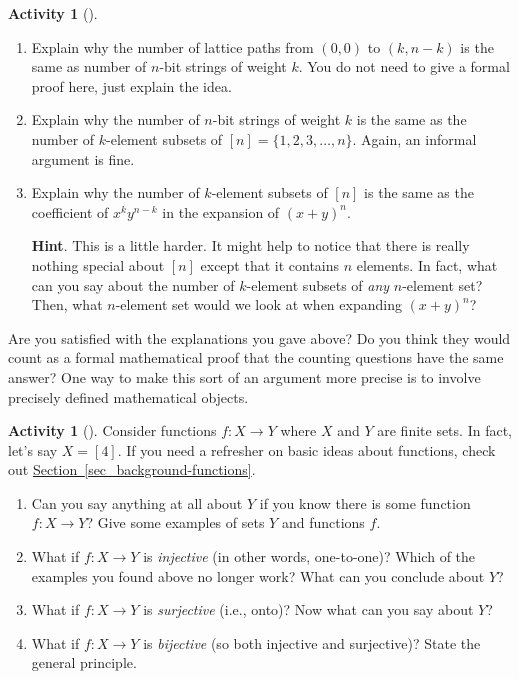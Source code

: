 \documentclass[10pt,]{book}
\theoremstyle{plain}
\theoremstyle{definition}
\theoremstyle{definition}
\theoremstyle{definition}
\newtheorem{activity}[project]{Activity}
\theoremstyle{definition}
\numberwithin{equation}{chapter}
\begin{document}
\begin{activity}[]\label{activity-11}
\leavevmode%
\begin{enumerate}[font=\bfseries,label=(\alph*),ref=\alph*]
\item\label{task-19} \hypertarget{p-413}{}%
Explain why the number of lattice paths from \((0,0)\) to \((k,n-k)\) is the same as number of \(n\)-bit strings of weight \(k\). You do not need to give a formal proof here, just explain the idea.%
\item\label{task-20} \hypertarget{p-414}{}%
Explain why the number of \(n\)-bit strings of weight \(k\) is the same as the number of \(k\)-element subsets of \([n] = \{1,2,3,\ldots, n\}\).   Again, an informal argument is fine.%
\item\label{task-21} \hypertarget{p-415}{}%
Explain why the number of \(k\)-element subsets of \([n]\) is the same as the coefficient of \(x^ky^{n-k}\) in the expansion of \((x+y)^n\).%
\par\smallskip%
\noindent\textbf{Hint}.\hypertarget{hint-3}{}\quad%
\hypertarget{p-416}{}%
This is a little harder.  It might help to notice that there is really nothing special about \([n]\) except that it contains \(n\) elements.  In fact, what can you say about the number of \(k\)-element subsets of \emph{any} \(n\)-element set?  Then, what \(n\)-element set would we look at when expanding \((x+y)^n\)?%
\end{enumerate}
\end{activity}
\hypertarget{p-417}{}%
Are you satisfied with the explanations you gave above?  Do you think they would count as a formal mathematical proof that the counting questions have the same answer?  One way to make this sort of an argument more precise is to involve precisely defined mathematical objects.%
\begin{activity}[]\label{activity-12}
\hypertarget{p-418}{}%
Consider functions \(f:X \to Y\) where \(X\) and \(Y\) are finite sets.  In fact, let's say \(X = [4]\). If you need a refresher on basic ideas about functions, check out \hyperref[sec_background-functions]{Section~\ref{sec_background-functions}}.%
\begin{enumerate}[font=\bfseries,label=(\alph*),ref=\alph*]
\item\label{task-22} \hypertarget{p-419}{}%
Can you say anything at all about \(Y\) if you know there is some function \(f:X \to Y\)?  Give some examples of sets \(Y\) and functions \(f\).%
\item\label{task-23} \hypertarget{p-420}{}%
What if \(f:X \to Y\) is \emph{injective} (in other words, one-to-one)?  Which of the examples you found above no longer work?  What can you conclude about \(Y\)?%
\item\label{task-24} \hypertarget{p-421}{}%
What if \(f:X \to Y\) is \emph{surjective} (i.e., onto)?  Now what can you say about \(Y\)?%
\item\label{task-25} \hypertarget{p-422}{}%
What if \(f:X\to Y\) is \emph{bijective} (so both injective and surjective)?  State the general principle.%
\end{enumerate}
\end{activity}
\end{document}
